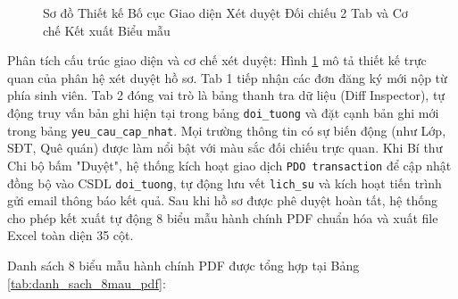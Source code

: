 \documentclass[12pt,a4paper]{report}
\begin{document}
\begin{figure}[htbp]
\begin{minipage}{\linewidth}
{}
    \vspace{0.2em}
  \end{minipage}
  \caption{Sơ đồ Thiết kế Bố cục Giao diện Xét duyệt Đối chiếu 2 Tab và Cơ chế Kết xuất Biểu mẫu}
  \label{fig:ui_duyet_2tab}
\end{figure}

Phân tích cấu trúc giao diện và cơ chế xét duyệt: Hình \ref{fig:ui_duyet_2tab} mô tả thiết kế trực quan của phân hệ xét duyệt hồ sơ. Tab 1 tiếp nhận các đơn đăng ký mới nộp từ phía sinh viên. Tab 2 đóng vai trò là bảng thanh tra dữ liệu (Diff Inspector), tự động truy vấn bản ghi hiện tại trong bảng \texttt{doi\_tuong} và đặt cạnh bản ghi mới trong bảng \texttt{yeu\_cau\_cap\_nhat}. Mọi trường thông tin có sự biến động (như Lớp, SĐT, Quê quán) được làm nổi bật với màu sắc đối chiếu trực quan. Khi Bí thư Chi bộ bấm "Duyệt", hệ thống kích hoạt giao dịch \texttt{PDO transaction} để cập nhật đồng bộ vào CSDL \texttt{doi\_tuong}, tự động lưu vết \texttt{lich\_su} và kích hoạt tiến trình gửi email thông báo kết quả. Sau khi hồ sơ được phê duyệt hoàn tất, hệ thống cho phép kết xuất tự động 8 biểu mẫu hành chính PDF chuẩn hóa và xuất file Excel toàn diện 35 cột.

Danh sách 8 biểu mẫu hành chính PDF được tổng hợp tại Bảng \ref{tab:danh_sach_8mau_pdf}:
\end{document}
